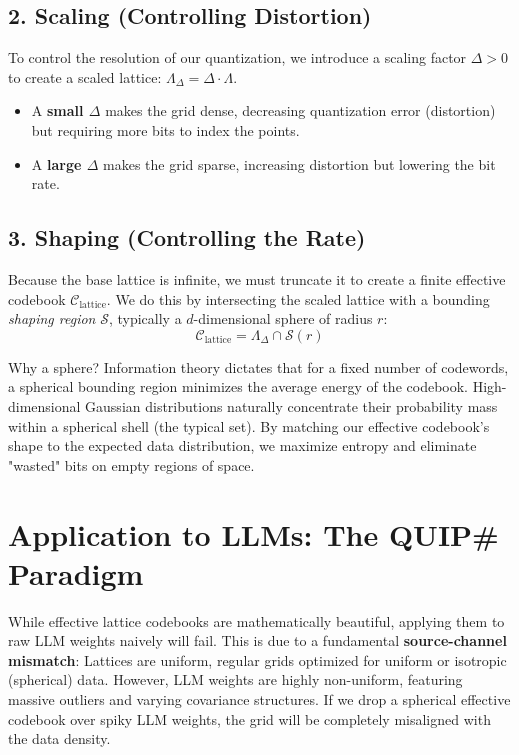 \documentclass[11pt]{article}
\begin{document}
\subsection{2. Scaling (Controlling Distortion)}
To control the resolution of our quantization, we introduce a scaling factor $\Delta > 0$ to create a scaled lattice: $\Lambda_\Delta = \Delta \cdot \Lambda$. 
\begin{itemize}
    \item A \textbf{small $\Delta$} makes the grid dense, decreasing quantization error (distortion) but requiring more bits to index the points.
    \item A \textbf{large $\Delta$} makes the grid sparse, increasing distortion but lowering the bit rate.
\end{itemize}

\subsection{3. Shaping (Controlling the Rate)}
Because the base lattice is infinite, we must truncate it to create a finite effective codebook $\mathcal{C}_{\text{lattice}}$. We do this by intersecting the scaled lattice with a bounding \textit{shaping region} $\mathcal{S}$, typically a $d$-dimensional sphere of radius $r$:
\begin{equation}
    \mathcal{C}_{\text{lattice}} = \Lambda_\Delta \cap \mathcal{S}(r)
\end{equation}

Why a sphere? Information theory dictates that for a fixed number of codewords, a spherical bounding region minimizes the average energy of the codebook. High-dimensional Gaussian distributions naturally concentrate their probability mass within a spherical shell (the typical set). By matching our effective codebook's shape to the expected data distribution, we maximize entropy and eliminate "wasted" bits on empty regions of space.

\section{Application to LLMs: The QUIP\# Paradigm}

While effective lattice codebooks are mathematically beautiful, applying them to raw LLM weights naively will fail. This is due to a fundamental \textbf{source-channel mismatch}: Lattices are uniform, regular grids optimized for uniform or isotropic (spherical) data. However, LLM weights are highly non-uniform, featuring massive outliers and varying covariance structures. If we drop a spherical effective codebook over spiky LLM weights, the grid will be completely misaligned with the data density.
\end{document}

